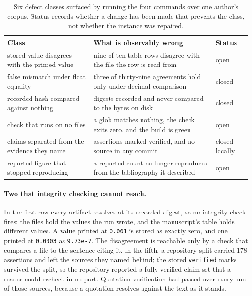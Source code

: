 \documentclass{article}
\newcommand{\code}[1]{\texttt{#1}}
\begin{document}
\begin{table}[h]
\centering
\small
\caption{Six defect classes surfaced by running the four commands over one author's corpus. Status
records whether a change has been made that prevents the class, not whether the instance was
repaired.}
\label{tab:defects}
\begin{tabular}{@{}>{\raggedright\arraybackslash}p{}>{\raggedright\arraybackslash}p{}>{\raggedright\arraybackslash}p{}@{}}
\toprule
\textbf{Class} & \textbf{What is observably wrong} & \textbf{Status} \\
\midrule
stored value disagrees with the printed value & nine of ten table rows disagree with the file the row is read from & open \\
false mismatch under float equality & three of thirty-nine agreements hold only under decimal comparison & closed \\
recorded hash compared against nothing & digests recorded and never compared to the bytes on disk & closed \\
check that runs on no files & a glob matches nothing, the check exits zero, and the build is green & open \\
claims separated from the evidence they name & 178 assertions marked verified, and no source in any commit & closed locally \\
reported figure that stopped reproducing & a reported count no longer reproduces from the bibliography it described & open \\
\bottomrule
\end{tabular}
\end{table}

\paragraph{Two that integrity checking cannot reach.} In the first row every artifact resolves at
its recorded digest, so no integrity check fires: the files hold the values the run wrote, and the
manuscript's table holds different values. A value printed at \code{0.001} is stored as exactly
zero, and one printed at \code{0.0003} as \code{9.73e-7}. The disagreement is reachable only by a
check that compares a file to the sentence citing it. In the fifth, a repository split carried 178
assertions and left the sources they named behind; the stored \code{verified} marks survived the
split, so the repository reported a fully verified claim set that a reader could recheck in no
part. Quotation verification had passed over every one of those sources, because a quotation
resolves against the text as it stands.
\end{document}
